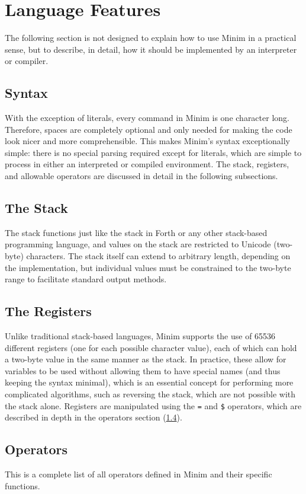 \documentclass{article}
\begin{document}
\section{Language Features}
The following section is not designed to explain how to use Minim in a practical sense, but to describe, in detail, how it should be implemented by an interpreter or compiler.
\subsection{Syntax}
With the exception of literals, every command in Minim is one character long. Therefore, spaces are completely optional and only needed for making the code look nicer and more comprehensible. This makes Minim's syntax exceptionally simple: there is no special parsing required except for literals, which are simple to process in either an interpreted or compiled environment. The stack, registers, and allowable operators are discussed in detail in the following subsections.
\subsection{The Stack}
The stack functions just like the stack in Forth or any other stack-based programming language, and values on the stack are restricted to Unicode (two-byte) characters. The stack itself can extend to arbitrary length, depending on the implementation, but individual values must be constrained to the two-byte range to facilitate standard output methods.
\subsection{The Registers}
Unlike traditional stack-based languages, Minim supports the use of 65536 different registers (one for each possible character value), each of which can hold a two-byte value in the same manner as the stack. In practice, these allow for variables to be used without allowing them to have special names (and thus keeping the syntax minimal), which is an essential concept for performing more complicated algorithms, such as reversing the stack, which are not possible with the stack alone. Registers are manipulated using the \texttt{=} and \texttt{\$} operators, which are described in depth in the operators section (\ref{subsec:operators}).
\subsection{Operators}
\label{subsec:operators}
This is a complete list of all operators defined in Minim and their specific functions.
\end{document}
